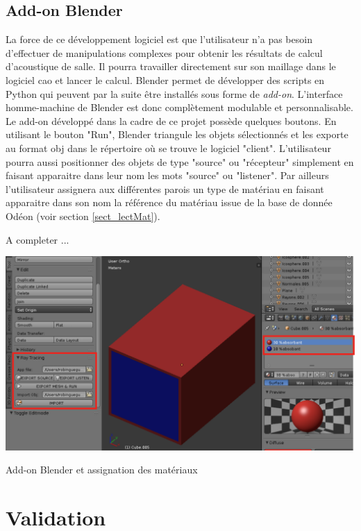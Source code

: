 \section{Add-on Blender} \label{sect_add-on}
La force de ce développement logiciel est que l'utilisateur n'a pas besoin d'effectuer de manipulations complexes pour obtenir les résultats de calcul d'acoustique de salle. Il pourra travailler directement sur son maillage dans le logiciel \gls{cao} et lancer le calcul. Blender permet de développer des scripts en Python qui peuvent par la suite être installés sous forme de \textit{add-on}. L'interface homme-machine de Blender est donc complètement modulable et personnalisable. Le add-on développé dans la cadre de ce projet possède quelques boutons. En utilisant le bouton "Run", Blender triangule les objets sélectionnés et les exporte au format \gls{obj} dans le répertoire où se trouve le logiciel "client". L'utilisateur pourra aussi positionner des objets de type "source" ou "récepteur" simplement en faisant apparaitre dans leur nom les mots "source" ou "listener". Par ailleurs l'utilisateur assignera aux différentes parois un type de matériau en faisant apparaitre dans son nom la référence du matériau issue de la base de donnée Odéon (voir section \ref{sect_lectMat}). 

A completer ...


\begin{figureth}
	\includegraphics[width=\linewidth]{images/add-on}
	\caption{Add-on Blender et assignation des matériaux}
\end{figureth}










\chapter{Validation}
	\minitoc
	\newpage
	
